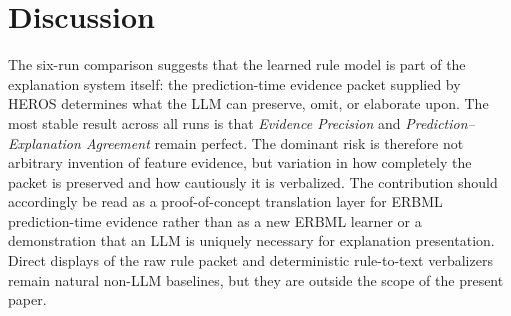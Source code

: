 \documentclass[sigconf]{acmart}
\begin{document}
\begin{table}[t]
\caption{Cross-dataset audience comparison under both HEROS training profiles. Rows compare \emph{layman}, \emph{clinician}, and \emph{expert} after aggregating across datasets. \emph{Evidence precision} and \emph{prediction--explanation agreement} are omitted. Judge scores are on a 0--1 scale and should be interpreted cautiously. Percentage-style metrics are shown as percentages. Abbreviations are the same as in Table \ref{tab:prompt-trends}.}
\vspace{-2mm}
\label{tab:audience-trends}
\centering
\footnotesize
\setlength{\tabcolsep}{2pt}
\renewcommand{\arraystretch}{1.02}
\end{table}

\section{Discussion}
The six-run comparison suggests that the learned rule model is part of the explanation system itself: the prediction-time evidence packet supplied by HEROS determines what the LLM can preserve, omit, or elaborate upon. The most stable result across all runs is that \emph{Evidence Precision} and \emph{Prediction--Explanation Agreement} remain perfect. The dominant risk is therefore not arbitrary invention of feature evidence, but variation in how completely the packet is preserved and how cautiously it is verbalized. The contribution should accordingly be read as a proof-of-concept translation layer for ERBML prediction-time evidence rather than as a new ERBML learner or a demonstration that an LLM is uniquely necessary for explanation presentation. Direct displays of the raw rule packet and deterministic rule-to-text verbalizers remain natural non-LLM baselines, but they are outside the scope of the present paper.
\end{document}
